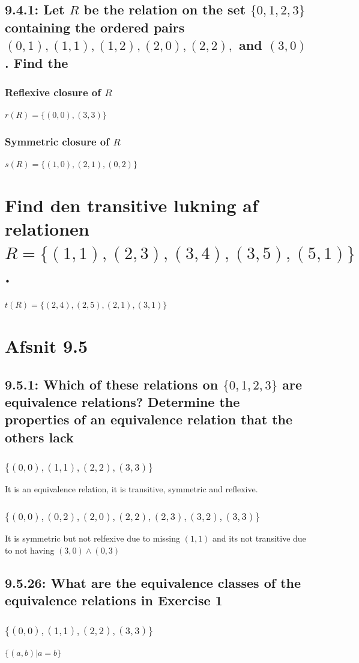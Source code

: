 \documentclass[12pt, a4paper]{report}
\begin{document}
				\subsection{9.4.1: Let $R$ be the relation on the set $\{0,1,2,3\}$ containing the ordered pairs $(0,1),(1,1),(1,2),(2,0),(2,2),$ and $(3,0)$. Find the}
					\subsubsection{Reflexive closure of $R$}
						$r(R)=\{(0,0),(3,3)\}$
					\subsubsection{Symmetric closure of $R$}
						$s(R)=\{(1,0),(2,1),(0,2)\}$
			\section{Find den transitive lukning af relationen $R=\{(1,1),(2,3),(3,4),(3,5),(5,1)\}$.}
				$t(R)=\{(2,4),(2,5),(2,1),(3,1)\}$
			\section{Afsnit 9.5}
				\setcounter{subsection}{0}
				\subsection{9.5.1: Which of these relations on $\{0,1,2,3\}$ are equivalence relations? Determine the properties of an equivalence relation that the others lack}
					\subsubsection{$\{(0,0),(1,1),(2,2),(3,3)\}$}
						It is an equivalence relation, it is transitive, symmetric and reflexive.	
					\subsubsection{$\{(0,0),(0,2),(2,0),(2,2),(2,3),(3,2),(3,3)\}$}
						It is symmetric but not relfexive due to missing $(1,1)$ and its not transitive due to not having $(3,0)\land (0,3)$
				\setcounter{subsection}{25}
				\subsection{9.5.26: What are the equivalence classes of the equivalence relations in Exercise 1}
					\subsubsection{$\{(0,0),(1,1),(2,2),(3,3)\}$}
						$\{(a,b)|a=b\}$
\end{document}
